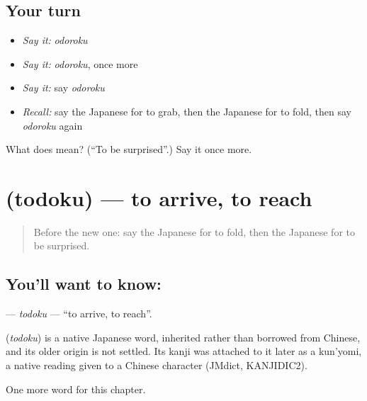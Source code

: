 \subsection*{Your turn}
\begin{itemize}
\raggedright
  \item \emph{Say it:} \emph{odoroku}
  \item \emph{Say it:} \emph{odoroku}, once more
  \item \emph{Say it:} say \emph{odoroku}
  \item \emph{Recall:} say the Japanese for to grab, then the Japanese for to fold, then say \emph{odoroku} again
\end{itemize}

\begin{tcolorbox}[breakable,colback=teal!4,colframe=teal!35!black,title={Before you move on}]
What does  mean? (\textquotedblleft{}To be surprised\textquotedblright{}.) Say it once more.
\end{tcolorbox}
\section[\texorpdfstring{\ja{とどく} (todoku)}{とどく (todoku)}]{ (todoku) — to arrive, to reach}

\label{lesson:JA-C90-todoku}



\begin{quote}
Before the new one: say the Japanese for to fold, then the Japanese for to be surprised.
\end{quote}

\subsection*{You'll want to know: }
\textbf{} — \emph{todoku} — \textquotedblleft{}to arrive, to reach\textquotedblright{}.

\begin{cousinweb}
\textbf{} (\emph{todoku}) is a native Japanese word, inherited rather than borrowed from Chinese, and its older origin is not settled. Its kanji was attached to it later as a kun'yomi, a native reading given to a Chinese character (JMdict, KANJIDIC2).
\end{cousinweb}

\begin{grammarlens}[title={What you've built}]
One more word for this chapter.
\end{grammarlens}

